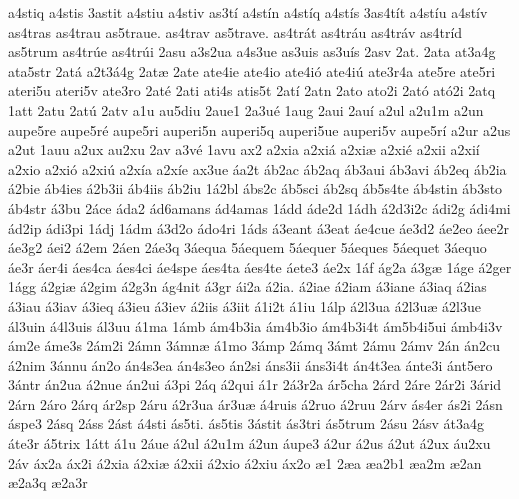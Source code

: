 {a4stiq
a4stis
3astit
a4stiu
a4stiv
as3t^^ed
a4st^^edn
a4st^^edq
a4st^^eds
3as4t^^edt
a4st^^edu
a4st^^edv
as4tras
as4trau
as5traue.
as4trav
as5trave.
as4tr^^e1t
as4tr^^e1u
as4tr^^e1v
as4tr^^edd
as5trum
as4tr^^fae
as4tr^^fai
2asu
a3s2ua
a4s3ue
as3uis
as3u^^eds
2asv
2at.
2ata
at3a4g
ata5str
2at^^e1
a2t3^^e14g
2at^^e6
2ate
ate4ie
ate4io
ate4i^^f3
ate4i^^fa
ate3r4a
ate5re
ate5ri
ateri5u
ateri5v
ate3ro
2at^^e9
2ati
ati4s
atis5t
2at^^ed
2atn
2ato
ato2i
2at^^f3
at^^f32i
2atq
1att
2atu
2at^^fa
2atv
a1u
au5diu
2aue1
2a3u^^e9
1aug
2aui
2au^^ed
a2ul
a2u1m
a2un
aupe5re
aupe5r^^e9
aupe5ri
auperi5n
auperi5q
auperi5ue
auperi5v
aupe5r^^ed
a2ur
a2us
a2ut
1auu
a2ux
au2xu
2av
a3v^^e9
1avu
ax2
a2xia
a2xi^^e1
a2xi^^e6
a2xi^^e9
a2xii
a2xi^^ed
a2xio
a2xi^^f3
a2xi^^fa
a2x^^eda
a2x^^ede
ax3ue
^^e1a2t
^^e1b2ac
^^e1b2aq
^^e1b3aui
^^e1b3avi
^^e1b2eq
^^e1b2ia
^^e12bie
^^e1b4ies
^^e12b3ii
^^e1b4iis
^^e1b2iu
1^^e12bl
^^e1bs2c
^^e1b5sci
^^e1b2sq
^^e1b5s4te
^^e1b4stin
^^e1b3sto
^^e1b4str
^^e13bu
2^^e1ce
^^e1da2
^^e1d6amans
^^e1d4amas
1^^e1dd
^^e1de2d
1^^e1dh
^^e12d3i2c
^^e1di2g
^^e1di4mi
^^e1d2ip
^^e1di3pi
1^^e1dj
1^^e1dm
^^e13d2o
^^e1do4ri
1^^e1ds
^^e13eant
^^e13eat
^^e1e4cue
^^e1e3d2
^^e1e2eo
^^e1ee2r
^^e1e3g2
^^e1ei2
^^e12em
2^^e1en
2^^e1e3q
3^^e1equa
5^^e1equem
5^^e1equer
5^^e1eques
5^^e1equet
3^^e1equo
^^e1e3r
^^e1er4i
^^e1es4ca
^^e1es4ci
^^e1e4spe
^^e1es4ta
^^e1es4te
^^e1ete3
^^e1e2x
1^^e1f
^^e1g2a
^^e13g^^e6
1^^e1ge
^^e12ger
1^^e1gg
^^e12gi^^e6
^^e12gim
^^e12g3n
^^e1g4nit
^^e13gr
^^e1i2a
^^e12ia.
^^e12iae
^^e12iam
^^e13iane
^^e13iaq
^^e12ias
^^e13iau
^^e13iav
^^e13ieq
^^e13ieu
^^e13iev
^^e12iis
^^e13iit
^^e11i2t
^^e11iu
1^^e1lp
^^e12l3ua
^^e12l3u^^e6
^^e12l3ue
^^e1l3uin
^^e14l3uis
^^e1l3uu
^^e11ma
1^^e1mb
^^e1m4b3ia
^^e1m4b3io
^^e1m4b3i4t
^^e1m5b4i5ui
^^e1mb4i3v
^^e1m2e
^^e1me3s
2^^e1m2i
2^^e1mn
3^^e1mn^^e6
^^e11mo
3^^e1mp
2^^e1mq
3^^e1mt
2^^e1mu
2^^e1mv
2^^e1n
^^e1n2cu
^^e12nim
3^^e1nnu
^^e1n2o
^^e1n4s3ea
^^e1n4s3eo
^^e1n2si
^^e1ns3ii
^^e1ns3i4t
^^e1n4t3ea
^^e1nte3i
^^e1nt5ero
3^^e1ntr
^^e1n2ua
^^e12nue
^^e1n2ui
^^e13pi
2^^e1q
^^e12qui
^^e11r
2^^e13r2a
^^e1r5cha
2^^e1rd
2^^e1re
2^^e1r2i
3^^e1rid
2^^e1rn
2^^e1ro
2^^e1rq
^^e1r2sp
2^^e1ru
^^e12r3ua
^^e1r3u^^e6
^^e14ruis
^^e12ruo
^^e12ruu
2^^e1rv
^^e1s4er
^^e1s2i
2^^e1sn
^^e1spe3
2^^e1sq
2^^e1ss
2^^e1st
^^e14sti
^^e1s5ti.
^^e1s5tis
3^^e1stit
^^e1s3tri
^^e1s5trum
2^^e1su
2^^e1sv
^^e1t3a4g
^^e1te3r
^^e15trix
1^^e1tt
^^e11u
2^^e1ue
^^e12ul
^^e12u1m
^^e12un
^^e1upe3
^^e12ur
^^e12us
^^e12ut
^^e12ux
^^e1u2xu
2^^e1v
^^e1x2a
^^e1x2i
^^e12xia
^^e12xi^^e6
^^e12xii
^^e12xio
^^e12xiu
^^e1x2o
^^e61
2^^e6a
^^e6a2b1
^^e6a2m
^^e62an
^^e62a3q
^^e62a3r
}
